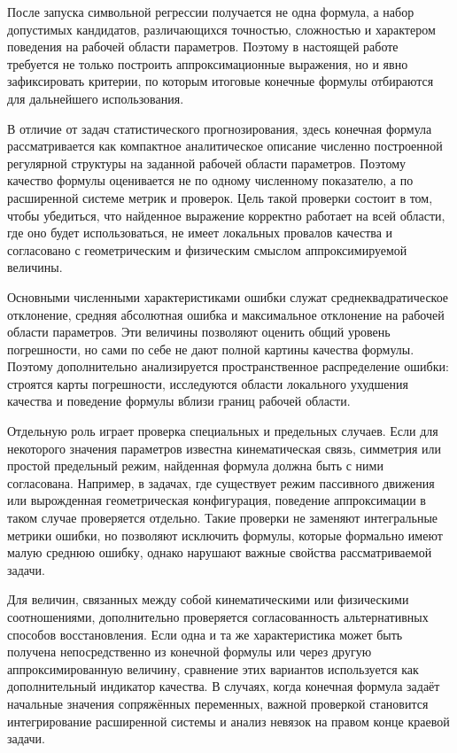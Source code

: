 После запуска символьной регрессии получается не одна формула, а набор допустимых кандидатов, различающихся точностью, сложностью и характером поведения на рабочей области параметров. Поэтому в настоящей работе требуется не только построить аппроксимационные выражения, но и явно зафиксировать критерии, по которым итоговые конечные формулы отбираются для дальнейшего использования.

В отличие от задач статистического прогнозирования, здесь конечная формула рассматривается как компактное аналитическое описание численно построенной регулярной структуры на заданной рабочей области параметров. Поэтому качество формулы оценивается не по одному численному показателю, а по расширенной системе метрик и проверок. Цель такой проверки состоит в том, чтобы убедиться, что найденное выражение корректно работает на всей области, где оно будет использоваться, не имеет локальных провалов качества и согласовано с геометрическим и физическим смыслом аппроксимируемой величины.

Основными численными характеристиками ошибки служат среднеквадратическое отклонение, средняя абсолютная ошибка и максимальное отклонение на рабочей области параметров. Эти величины позволяют оценить общий уровень погрешности, но сами по себе не дают полной картины качества формулы. Поэтому дополнительно анализируется пространственное распределение ошибки: строятся карты погрешности, исследуются области локального ухудшения качества и поведение формулы вблизи границ рабочей области.

Отдельную роль играет проверка специальных и предельных случаев. Если для некоторого значения параметров известна кинематическая связь, симметрия или простой предельный режим, найденная формула должна быть с ними согласована. Например, в задачах, где существует режим пассивного движения или вырожденная геометрическая конфигурация, поведение аппроксимации в таком случае проверяется отдельно. Такие проверки не заменяют интегральные метрики ошибки, но позволяют исключить формулы, которые формально имеют малую среднюю ошибку, однако нарушают важные свойства рассматриваемой задачи.

Для величин, связанных между собой кинематическими или физическими соотношениями, дополнительно проверяется согласованность альтернативных способов восстановления. Если одна и та же характеристика может быть получена непосредственно из конечной формулы или через другую аппроксимированную величину, сравнение этих вариантов используется как дополнительный индикатор качества. В случаях, когда конечная формула задаёт начальные значения сопряжённых переменных, важной проверкой становится интегрирование расширенной системы и анализ невязок на правом конце краевой задачи.


